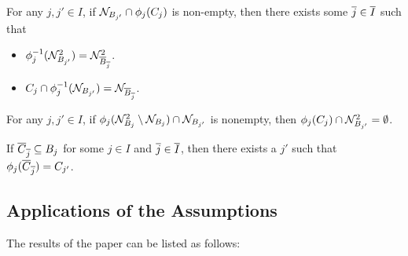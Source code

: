 \begin{nassu}
\begin{subnassu}
For any \(j,j' \in I\), if \(\mathcal{N}_{B_{j'}}\cap\phi_j(C_j)\) is non-empty, then there exists some \(\overline{j} \in \overline{I}\) such that

\begin{itemize}
\item \(\phi^{-1}_j(\mathcal{N}^2_{B_{j'}}) = \mathcal{N}^2_{\overline{B}_{\overline{j}}}\).

\item \(C_j\cap\phi_j^{-1}(\mathcal{N}_{B_{j'}}) = \mathcal{N}_{\overline{B}_{\overline{j}}}\).
\end{itemize}
\end{subnassu}

\begin{subnassu}
\label{uniqgeo::exC}

For any \(j,j' \in I\), if \(\phi_j(\mathcal{N}^2_{B_j}\setminus \mathcal{N}_{B_j})\cap\mathcal{N}_{B_{j'}}\) is nonempty, then \(\phi_j(C_j) \cap\mathcal{N}^2_{B_{j'}} = \emptyset\).
\end{subnassu}

\begin{subnassu}
\label{uniqgeo::Cmatch}

If \(\overline{C}_{\overline{j}} \subseteq B_j\) for some \(j \in I\) and \(\overline{j}\in \overline{I}\), then there exists a \(j'\) such that \(\phi_j(\overline{C}_{\overline{j}}) = C_{j'}\).
\end{subnassu}

\end{nassu}
\lin

\subsection{Applications of the Assumptions}

The results of the paper can be listed as follows:

